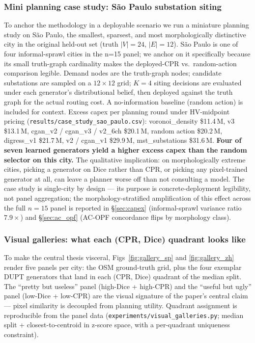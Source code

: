 \documentclass[10pt,a4paper]{article}
\begin{document}
\subsubsection{Mini planning case study: São Paulo substation siting}

To anchor the methodology in a deployable scenario we run a
miniature planning study on São Paulo, the smallest, sparsest,
and most morphologically distinctive city in the original
held-out set (truth $|V| = 24$, $|E| = 12$). São Paulo is one
of four informal-sprawl cities in the n=15 panel; we anchor on
it specifically because its small truth-graph cardinality makes
the deployed-CPR vs.\ random-action comparison legible. Demand
nodes are the truth-graph nodes; candidate substations are
sampled on a $12 \times 12$ grid; $K = 4$ siting decisions are
evaluated under each generator's distributional belief, then
deployed against the truth graph for the actual routing cost. A
no-information baseline (random action) is included for context.
Excess capex per planning round under HV-midpoint pricing
(\texttt{results/case\_study\_sao\_paulo.csv}):
voronoi\_density \$11.4\,M, v3 \$13.1\,M, cgan\_v2 / cgan\_v3 /
v2\_6ch \$20.1\,M, random action \$20.2\,M, digress\_v1
\$21.7\,M, v2 / cgan\_v1 \$29.9\,M, mst\_substations \$31.6\,M.
\textbf{Four of seven learned generators yield a higher excess
capex than the random selector on this city.} The qualitative
implication: on morphologically extreme cities, picking a
generator on Dice rather than CPR, or picking any pixel-trained
generator at all, can leave a planner worse off than not
consulting a model. The case study is single-city by design ---
its purpose is concrete-deployment legibility, not panel
aggregation; the morphology-stratified
amplification of this effect across the full $n = 15$ panel is
reported in §\ref{sec:capex} (informal-sprawl variance ratio
$7.9\times$) and §\ref{sec:ac_opf} (AC-OPF concordance flips by
morphology class).

\subsubsection{Visual galleries: what each (CPR, Dice) quadrant
looks like}

To make the central thesis visceral, Figs~\ref{fig:gallery_sp} and
\ref{fig:gallery_zh} render five panels per city: the OSM
ground-truth grid, plus the four exemplar DUPT generators that land
in each (CPR, Dice) quadrant of the median split. The ``pretty but
useless'' panel (high-Dice + high-CPR) and the ``useful but ugly''
panel (low-Dice + low-CPR) are the visual signature of the paper's
central claim --- pixel similarity is decoupled from planning
utility. Quadrant assignment is reproducible from the panel data
(\texttt{experiments/visual\_galleries.py}; median split + closest-to-centroid
in z-score space, with a per-quadrant uniqueness constraint).
\end{document}
